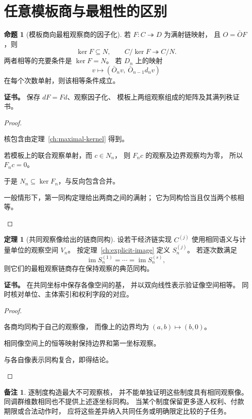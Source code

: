 \documentclass[UTF8,12pt,a4paper,openany,fontset=none,zihao=false]{ctexrep}
\theoremstyle{definition}
\newtheorem{theorem}{定理}[chapter]
\newtheorem{proposition}{命题}[chapter]
\newtheorem{remark}{备注}[chapter]
\newenvironment{certificate}{\par\noindent\textbf{证书。}\ignorespaces}{\par}
\newcommand{\1}{\mathbf 1}
\begin{document}
\section{任意模板商与最粗性的区别}
\begin{proposition}[模板商向最粗观察商的因子化]
\label{ch:template}
若 \(F:C\twoheadrightarrow D\) 为满射链映射，
且 \(O=\bar OF\)，则
\[
\ker F\subseteq N,\qquad
C/\ker F\twoheadrightarrow C/N.
\]
两者相等的充要条件是 \(\ker F=N\)。
若 \(D_n\) 上的映射
\[
v\longmapsto
(\bar O_nv,\ \bar O_{n-1}d_nv)
\]
在每个次数单射，则该相等条件成立。
\end{proposition}
\begin{certificate}
保存 \(dF=Fd\)、观察因子化、
模板上两组观察组成的矩阵及其满列秩证书。
\end{certificate}
\begin{proof}
\begin{semanticsteps}
\item 核包含由定理~\ref{ch:maximal-kernel} 得到。
\item 若模板上的联合观察单射，而 \(c\in N_n\)，
则 \(F_nc\) 的观察及边界观察均为零，
所以 \(F_nc=0\)。
\item 于是 \(N_n\subseteq\ker F_n\)，与反向包含合并。
\item 一般情形下，第一同构定理给出两商之间的满射；
它为同构恰当且仅当两个核相等。
\end{semanticsteps}
\end{proof}
\begin{theorem}[共同观察像给出的链商同构]
\label{ch:common-image}
设若干经济链实现 \(C^{(j)}\)
使用相同语义与计量单位的观察空间 \(V_n\)。
按定理~\ref{ch:explicit-image} 定义 \(S_n^{(j)}\)。
若逐次数满足
\[
\operatorname{im}S_n^{(1)}
=\cdots=\operatorname{im}S_n^{(s)},
\]
则它们的最粗观察链商存在保持观察的典范同构。
\end{theorem}
\begin{certificate}
在共同坐标中保存各像空间的基，
并以双向线性表示验证像空间相等。
同时核对单位、主体索引和权利字段的对应。
\end{certificate}
\begin{proof}
\begin{semanticsteps}
\item 各商均同构于自己的观察像，
而像上的边界均为 \((a,b)\mapsto(b,0)\)。
\item 相同像空间上的恒等映射保持边界和第一坐标观察。
\item 与各自像表示同构复合，即得结论。
\end{semanticsteps}
\end{proof}
\begin{remark}
逐制度构造最大不可观察核，
并不能单独证明这些制度具有相同观察像。
同调群维数相同也不提供上述逐坐标同构。
当某个制度保留更多逐人权利、付款期限或合法动作时，
应将这些差异纳入共同任务或明确限定比较的子任务。
\end{remark}
\end{document}
